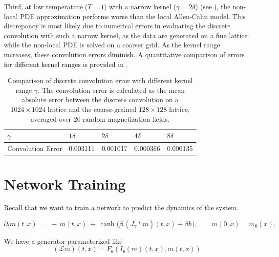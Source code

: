 \documentclass[11pt,a4paper]{article}
\begin{document}
Third, at low temperature ($T=1$) with a narrow kernel ($\gamma = 2\delta$) 
(see ), 
the non-local PDE approximation performs worse than the local Allen-Cahn model. 
This discrepancy is most likely due to numerical errors in evaluating the discrete convolution with such a narrow kernel, 
as the data are generated on a fine lattice while the non-local PDE is solved on a coarser grid. 
As the kernel range increases, these convolution errors diminish. 
A quantitative comparison of errors for different kernel ranges is provided in .

\begin{table}
    \centering
    \begin{tabular}{lllll}
        \hline
        \hline
        \textbf{$\gamma$} & $1\delta$ & $2\delta$ & $4\delta$ & $8\delta$ \\
        \hline
        Convolution Error & 0.003111 & 0.001017 & 0.000366 & 0.000135\\
        \hline
        \hline
    \end{tabular}
    \caption{Comparison of discrete convolution error with different kernel range $\gamma$. The convolution error is calculated as the mean absolute error between the discrete convolution on a $1024\times 1024$ lattice and the coarse-grained $128 \times 128$ lattice, averaged over 20 random magnetization fields.}
    \label{tab:convolution_error}
\end{table}

\section{Network Training}

Recall that we want to train a network to predict the dynamics of the system.

\begin{equation}\label{eq:nonlocal-recall}
\partial_t m(t,x) \;=\; -\,m(t,x)\;+\;\tanh\!\Big(\beta\, (J_\gamma * m)(t,x) + \beta h\Big), \qquad m(0,x)=m_0(x),
\end{equation}

We have a generator parameterized like
\begin{equation}
    (\mathcal{L}m)(t,x) = F_\theta(I_\theta (m)(t,x), m(t,x))
\end{equation}
\end{document}
